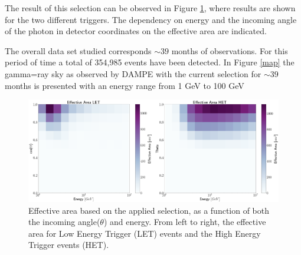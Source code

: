 \documentclass{PoS}
\begin{document}
The  result of this  selection can be observed in Figure \ref{eff_area}, where results are shown for the two different triggers. The dependency on energy and the incoming angle  of the photon in detector coordinates on the effective area are indicated.

The overall data set studied corresponds  $\sim 39$ months of observations. For  this period of time a total of  354,985 events have been detected. In Figure \ref{map} the gamma=ray sky as observed by DAMPE with the current selection for $\sim 39$ months is presented with an energy range from 1 GeV to 100 GeV 









\begin{figure}
  \includegraphics[scale=0.65]{effective_Area.png}
  \caption{Effective area based on the applied selection, as a function of both the incoming angle($\theta$) and energy. From left to right, the effective area for Low Energy Trigger (LET) events and the High Energy Trigger events (HET). }
  \label{eff_area}
\end{figure}
\end{document}
